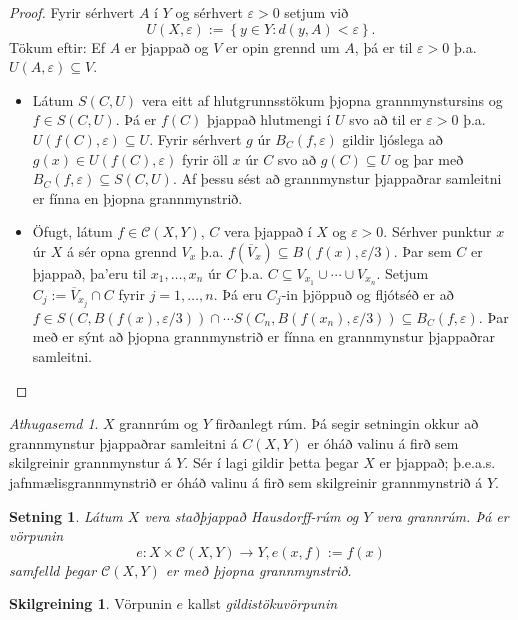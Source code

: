 \documentclass[a4paper,icelandic]{book}
\theoremstyle{definition}
\newtheorem{skilgr}{Skilgreining}[section]
\theoremstyle{plain}
\newtheorem{setn}{Setning}[section]
\theoremstyle{remark}
\newtheorem*{ath}{Athugasemd}
\begin{document}
\begin{proof}
  Fyrir sérhvert $A$ í $Y$ og sérhvert $\varepsilon>0$ setjum við\[
  U(X,\varepsilon) := \left\{ y\in Y:d(y,A)<\varepsilon \right\}.
  \]
  Tökum eftir: Ef $A$ er þjappað og $V$ er opin grennd um $A$, þá er til
  $\varepsilon>0$ þ.a. $U(A,\varepsilon)\subseteq V$.
  \begin{itemize}
    \item Látum $S(C,U)$ vera eitt af hlutgrunnsstökum þjopna
      grannmynstursins og $f\in S(C,U)$. Þá er $f(C)$ þjappað hlutmengi
      í $U$ svo að til er $\varepsilon>0$ þ.a.
      $U(f(C),\varepsilon)\subseteq U$. Fyrir sérhvert $g$ úr
      $B_C(f,\varepsilon)$ gildir ljóslega að $g(x)\in
      U(f(C),\varepsilon)$ fyrir öll $x$ úr $C$ svo að $g(C)\subseteq U$
      og þar með $B_C(f,\varepsilon)\subseteq S(C,U)$. Af þessu sést að
      grannmynstur þjappaðrar samleitni er fínna en þjopna
      grannmynstrið.
    \item Öfugt, látum $f\in\mathcal C(X,Y)$, $C$ vera þjappað í $X$ og
      $\varepsilon>0$. Sérhver punktur $x$ úr $X$ á sér opna grennd
      $V_x$ þ.a. $f(\overline V_x)\subseteq B(f(x),\varepsilon/3)$. Þar
      sem $C$ er þjappað, þa'eru til $x_1,\dots,x_n$ úr $C$ þ.a.
      $C\subseteq V_{x_1}\cup\cdots\cup V_{x_n}$. Setjum $C_j
      :=\overline V_{x_j}\cap C$ fyrir $j=1,\dots,n$. Þá eru $C_j$-in
      þjöppuð og fljótséð er að $f\in S(C,B(f(x),\varepsilon/3))\cap
      \cdots S(C_n,B(f(x_n),\varepsilon/3))\subseteq
      B_C(f,\varepsilon)$. Þar með er sýnt að þjopna grannmynstrið er
      fínna en grannmynstur þjappaðrar samleitni.
  \end{itemize}
\end{proof}
\begin{ath}
  $X$ grannrúm og $Y$ firðanlegt rúm. Þá segir setningin okkur að
  grannmynstur þjappaðrar samleitni á $C(X,Y)$ er óháð valinu á firð sem
  skilgreinir grannmynstur á $Y$. Sér í lagi gildir þetta þegar $X$ er
  þjappað; þ.e.a.s. jafnmælisgrannmynstrið er óháð valinu á firð sem
  skilgreinir grannmynstrið á $Y$.
\end{ath}
\begin{setn}
  Látum $X$ vera staðþjappað Hausdorff-rúm og $Y$ vera grannrúm. Þá er
  vörpunin\[
  e : X\times\mathcal C(X,Y)\to Y, e(x,f) := f(x)
  \]
  samfelld þegar $\mathcal C(X,Y)$ er með þjopna grannmynstrið.
\end{setn}
\begin{skilgr}
  Vörpunin $e$ kallst
  \emph{gildistökuvörpunin}
\end{skilgr}
\end{document}
